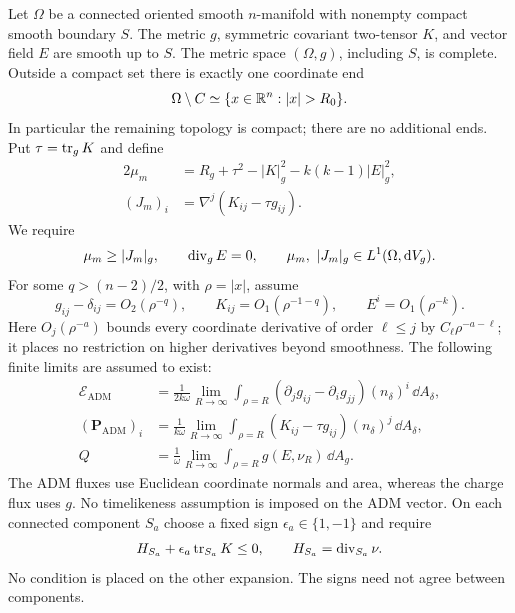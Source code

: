 \begin{definition}\label{def:data}
Let $\Omega$ be a connected oriented smooth $n$-manifold with nonempty compact smooth boundary $S$. The metric $g$, symmetric covariant two-tensor $K$, and vector field $E$ are smooth up to $S$. The metric space $(\Omega,g)$, including $S$, is complete. Outside a compact set there is exactly one coordinate end
\[
 \Omega\setminus C\simeq\{x\in\R^n:|x|>R_0\}.
\]
In particular the remaining topology is compact; there are no additional ends.
Put $\tau=\operatorname{tr}_gK$ and define
\begin{equation}\label{eq:matter-constraints}
 \begin{split}
 2\mu_m&=R_g+\tau^2-|K|_g^2-k(k-1)|E|_g^2,\\
 (J_m)_i&=\nabla^j(K_{ij}-\tau g_{ij}).
 \end{split}
\end{equation}
We require
\begin{equation}\label{eq:charged-dec}
 \mu_m\ge |J_m|_g,\qquad \operatorname{div}_gE=0,\qquad
 \mu_m,\ |J_m|_g\in L^1(\Omega,\mathrm d V_g).
\end{equation}
For some $q>(n-2)/2$, with $\rho=|x|$, assume
\begin{equation}\label{eq:weak-asymptotics}
 g_{ij}-\delta_{ij}=O_2(\rho^{-q}),\qquad
 K_{ij}=O_1(\rho^{-1-q}),\qquad
 E^i=O_1(\rho^{-k}).
\end{equation}
Here $O_j(\rho^{-a})$ bounds every coordinate derivative of order $\ell\le j$ by $C_\ell\rho^{-a-\ell}$; it places no restriction on higher derivatives beyond smoothness.
The following finite limits are assumed to exist:
\begin{align}
 \mathcal E_{\mathrm{ADM}}
 &=\frac1{2k\omega}\lim_{R\to\infty}
   \int_{\rho=R}(\partial_jg_{ij}-\partial_ig_{jj})
               (n_\delta)^i\,\dd A_\delta,\label{eq:adm-energy}\\
 (\mathbf P_{\mathrm{ADM}})_i
 &=\frac1{k\omega}\lim_{R\to\infty}
   \int_{\rho=R}(K_{ij}-\tau g_{ij})(n_\delta)^j\,\dd A_\delta,
   \label{eq:adm-momentum}\\
 Q&=\frac1\omega\lim_{R\to\infty}
   \int_{\rho=R}g(E,\nu_R)\,\dd A_g.\label{eq:charge}
\end{align}
The ADM fluxes use Euclidean coordinate normals and area, whereas the charge flux uses $g$. No timelikeness assumption is imposed on the ADM vector.
On each connected component $S_a$ choose a fixed sign $\epsilon_a\in\{1,-1\}$ and require
\begin{equation}\label{eq:mixed-trapping}
 H_{S_a}+\epsilon_a\operatorname{tr}_{S_a}K\le0,
 \qquad H_{S_a}=\operatorname{div}_{S_a}\nu.
\end{equation}
No condition is placed on the other expansion. The signs need not agree between components.
\end{definition}

